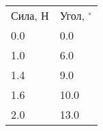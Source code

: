 \begin{tabular}{ll}
\hline
 Сила, Н & Угол, $^\circ$ \\
 0.0     & 0.0            \\
 1.0     & 6.0            \\
 1.4     & 9.0            \\
 1.6     & 10.0           \\
 2.0     & 13.0           \\
\hline
\end{tabular}